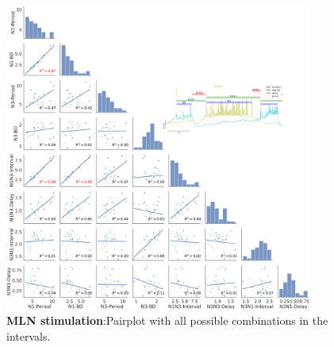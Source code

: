 \begin{figure}[htbp]
	\centering
	\includegraphics[width=0.9\textwidth]{./img/invariants/data/SUSSEX/MLN_driven/images/panel_with_pairplot.png}
	\caption{\textbf{MLN stimulation}:Pairplot with all possible combinations in the intervals.}
	\label{fig:mln stimulation pairplot}
\end{figure}

\newpage
